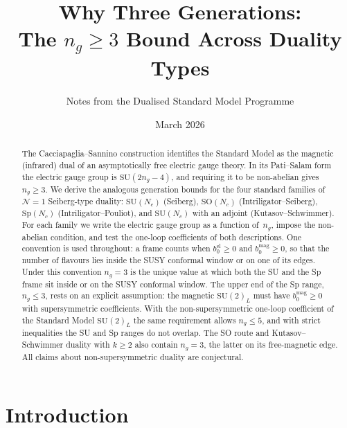 \documentclass[11pt,a4paper]{article}
\theoremstyle{plain}
\theoremstyle{definition}
\theoremstyle{remark}
\newcommand{\Nc}{N_{\!c}}
\newcommand{\ngen}{n_g}
\newcommand{\SU}[1]{\mathrm{SU}(#1)}
\newcommand{\SO}[1]{\mathrm{SO}(#1)}
\newcommand{\Sp}[1]{\mathrm{Sp}(#1)}
\begin{document}
\title{\textbf{Why Three Generations:\\
The $\ngen \geq 3$ Bound Across Duality Types}}
\author{Notes from the Dualised Standard Model Programme}
\date{March 2026}
\maketitle

\begin{abstract}
The Cacciapaglia--Sannino construction identifies the Standard Model as the
magnetic (infrared) dual of an asymptotically free electric gauge theory.
In its Pati--Salam form the electric gauge group is $\SU{2\ngen - 4}$, and
requiring it to be non-abelian gives $\ngen \geq 3$.  We derive the
analogous generation bounds for the four standard families of
$\mathcal{N}=1$ Seiberg-type duality: $\SU{\Nc}$ (Seiberg), $\SO{\Nc}$
(Intriligator--Seiberg), $\Sp{\Nc}$ (Intriligator--Pouliot), and
$\SU{\Nc}$ with an adjoint (Kutasov--Schwimmer).  For each family we
write the electric gauge group as a function of~$\ngen$, impose the
non-abelian condition, and test the one-loop coefficients of both
descriptions.  One convention is used throughout: a frame counts when
$b_0^{\mathrm{el}} \geq 0$ and $b_0^{\mathrm{mag}} \geq 0$, so that the
number of flavours lies inside the SUSY conformal window or on one of its
edges.  Under this convention $\ngen = 3$ is the unique value at which
both the SU and the Sp frame sit inside or on the SUSY conformal window.
The upper end of the Sp range, $\ngen \leq 3$, rests on an explicit
assumption: the magnetic $\SU{2}_L$ must have $b_0^{\mathrm{mag}} \geq 0$
with supersymmetric coefficients.  With the non-supersymmetric one-loop
coefficient of the Standard Model $\SU{2}_L$ the same requirement allows
$\ngen \leq 5$, and with strict inequalities the SU and Sp ranges do not
overlap.  The SO route and Kutasov--Schwimmer duality with $k \geq 2$
also contain $\ngen = 3$, the latter on its free-magnetic edge.  All
claims about non-supersymmetric duality are conjectural.
\end{abstract}

\tableofcontents
\newpage

\section{Introduction}
\label{sec:introduction}
\end{document}
